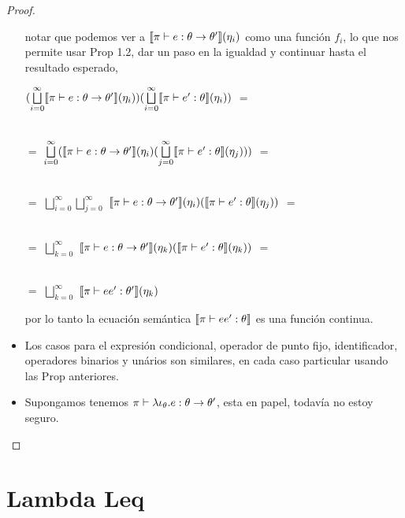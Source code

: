 \begin{proof}
\begin{itemize}
notar que podemos ver a $\llbracket \pi \vdash e : \theta \rightarrow \theta' \rrbracket (\eta_i)$
como una funci\'on $f_i$, lo que nos permite usar Prop 1.2, dar un paso en la igualdad y
continuar hasta el resultado esperado,\\

\begin{center}

$(\bigsqcup\limits^{\infty}_{i=0} \llbracket \pi \vdash e : \theta \rightarrow \theta' \rrbracket (\eta_i))
					(\bigsqcup\limits^{\infty}_{i=0} \llbracket \pi \vdash e' : \theta \rrbracket(\eta_i))$ 
$=$\\
\

$=$ 
$\bigsqcup\limits^{\infty}_{i=0} (
		\llbracket \pi \vdash e : \theta \rightarrow \theta' \rrbracket(\eta_i)
					(\bigsqcup\limits^{\infty}_{j=0} \llbracket \pi \vdash e' : \theta \rrbracket(\eta_j)))$ 
$=$\\
\

$=$
$\bigsqcup\limits^{\infty}_{i=0} \bigsqcup\limits^{\infty}_{j=0}$
$\llbracket \pi \vdash e : \theta \rightarrow \theta' \rrbracket(\eta_i)(\llbracket \pi \vdash e' : \theta \rrbracket(\eta_j))$ 
$=$\\
\

$=$
$\bigsqcup\limits^{\infty}_{k=0}$
$\llbracket \pi \vdash e : \theta \rightarrow \theta' \rrbracket(\eta_k)(\llbracket \pi \vdash e' : \theta \rrbracket(\eta_k))$ 
$=$\\
\

$=$
$\bigsqcup\limits^{\infty}_{k=0}$ $\llbracket \pi \vdash ee' : \theta' \rrbracket(\eta_k)$

\end{center}

por lo tanto la ecuaci\'on sem\'antica $\llbracket \pi \vdash ee' : \theta \rrbracket$ es una funci\'on 
continua.

\item Los casos para el expresi\'on condicional, operador de punto fijo, identificador, 
operadores binarios y un\'arios son similares, en cada caso particular usando las Prop anteriores.

\item Supongamos tenemos $\pi \vdash \lambda \iota_{\theta} . e : \theta \rightarrow \theta'$,
esta en papel, todav\'ia no estoy seguro.\\

\end{itemize}


\end{proof}

\section{Lambda Leq}

